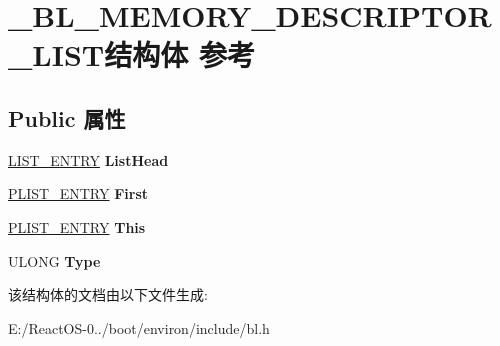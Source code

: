 \hypertarget{struct___b_l___m_e_m_o_r_y___d_e_s_c_r_i_p_t_o_r___l_i_s_t}{}\section{\+\_\+\+B\+L\+\_\+\+M\+E\+M\+O\+R\+Y\+\_\+\+D\+E\+S\+C\+R\+I\+P\+T\+O\+R\+\_\+\+L\+I\+S\+T结构体 参考}
\label{struct___b_l___m_e_m_o_r_y___d_e_s_c_r_i_p_t_o_r___l_i_s_t}
\subsection*{Public 属性}
\begin{DoxyCompactItemize}
\item 
\mbox{\label{struct___b_l___m_e_m_o_r_y___d_e_s_c_r_i_p_t_o_r___l_i_s_t_ab2eee57000567a07c792681c638a9451}} 
\hyperlink{struct___l_i_s_t___e_n_t_r_y}{L\+I\+S\+T\+\_\+\+E\+N\+T\+RY} {\bfseries List\+Head}
\item 
\mbox{\label{struct___b_l___m_e_m_o_r_y___d_e_s_c_r_i_p_t_o_r___l_i_s_t_ace99261d35f1d523cbcc5262c4b79cbd}} 
\hyperlink{struct___l_i_s_t___e_n_t_r_y}{P\+L\+I\+S\+T\+\_\+\+E\+N\+T\+RY} {\bfseries First}
\item 
\mbox{\label{struct___b_l___m_e_m_o_r_y___d_e_s_c_r_i_p_t_o_r___l_i_s_t_a42f9a866ca7f841108550fe26700be94}} 
\hyperlink{struct___l_i_s_t___e_n_t_r_y}{P\+L\+I\+S\+T\+\_\+\+E\+N\+T\+RY} {\bfseries This}
\item 
\mbox{\label{struct___b_l___m_e_m_o_r_y___d_e_s_c_r_i_p_t_o_r___l_i_s_t_ad50405d532f2215ca349900c8164f018}} 
U\+L\+O\+NG {\bfseries Type}
\end{DoxyCompactItemize}


该结构体的文档由以下文件生成\+:\begin{DoxyCompactItemize}
\item 
E\+:/\+React\+O\+S-\/0../boot/environ/include/bl.\+h\end{DoxyCompactItemize}
